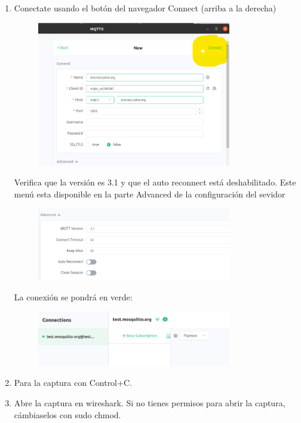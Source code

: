 \documentclass[12pt, a4paper]{report}
\begin{document}
\begin{enumerate}
	\item Conectate usando el botón del navegador Connect (arriba a la derecha)
	\begin{figure}[H]
		\centering
		\includegraphics[width=0.8\textwidth]{enun8}
	\end{figure}
	Verifica que la versión es 3.1 y que el auto reconnect está deshabilitado. Este menú esta disponible
	en la parte Advanced de la configuración del sevidor
	\begin{figure}[H]
		\centering
		\includegraphics[width=0.8\textwidth]{enun9}
	\end{figure}
	La conexión se pondrá en verde:
	\begin{figure}[H]
		\centering
		\includegraphics[width=0.8\textwidth]{enun10}
	\end{figure}
	\item Para la captura con Control+C.
	\item Abre la captura en wireshark. Si no tienes permisos para abrir la captura, cámbiaselos con
	sudo chmod.\\

\end{enumerate}
\end{document}
